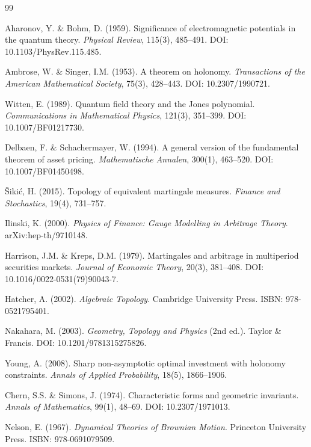 \begin{thebibliography}{99}

Aharonov, Y. \& Bohm, D. (1959). Significance of electromagnetic potentials in the quantum theory. \textit{Physical Review}, 115(3), 485--491. DOI: 10.1103/PhysRev.115.485.

Ambrose, W. \& Singer, I.M. (1953). A theorem on holonomy. \textit{Transactions of the American Mathematical Society}, 75(3), 428--443. DOI: 10.2307/1990721.

Witten, E. (1989). Quantum field theory and the Jones polynomial. \textit{Communications in Mathematical Physics}, 121(3), 351--399. DOI: 10.1007/BF01217730.

Delbaen, F. \& Schachermayer, W. (1994). A general version of the fundamental theorem of asset pricing. \textit{Mathematische Annalen}, 300(1), 463--520. DOI: 10.1007/BF01450498.

\v{S}iki\'c, H. (2015). Topology of equivalent martingale measures. \textit{Finance and Stochastics}, 19(4), 731--757.

Ilinski, K. (2000). \textit{Physics of Finance: Gauge Modelling in Arbitrage Theory}. arXiv:hep-th/9710148.

Harrison, J.M. \& Kreps, D.M. (1979). Martingales and arbitrage in multiperiod securities markets. \textit{Journal of Economic Theory}, 20(3), 381--408. DOI: 10.1016/0022-0531(79)90043-7.

Hatcher, A. (2002). \textit{Algebraic Topology}. Cambridge University Press. ISBN: 978-0521795401.

Nakahara, M. (2003). \textit{Geometry, Topology and Physics} (2nd ed.). Taylor \& Francis. DOI: 10.1201/9781315275826.

Young, A. (2008). Sharp non-asymptotic optimal investment with holonomy constraints. \textit{Annals of Applied Probability}, 18(5), 1866--1906.

Chern, S.S. \& Simons, J. (1974). Characteristic forms and geometric invariants. \textit{Annals of Mathematics}, 99(1), 48--69. DOI: 10.2307/1971013.

Nelson, E. (1967). \textit{Dynamical Theories of Brownian Motion}. Princeton University Press. ISBN: 978-0691079509.

\end{thebibliography}


